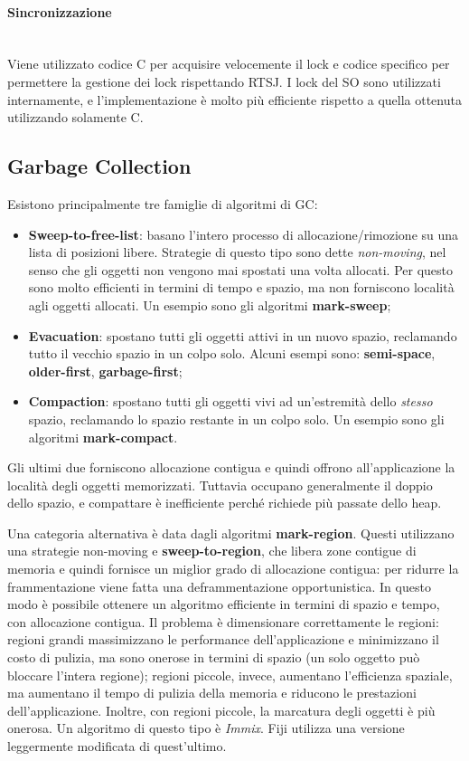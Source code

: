 \paragraph{Sincronizzazione} \mbox{} \\
Viene utilizzato codice C per acquisire velocemente il lock e codice specifico per permettere la gestione dei lock rispettando RTSJ. I lock del SO sono utilizzati internamente, e l'implementazione è molto più efficiente rispetto a quella ottenuta utilizzando solamente C.

\subsection{Garbage Collection} \label{sec:gc}
Esistono principalmente tre famiglie di algoritmi di GC:
\begin{itemize}
	\item \textbf{Sweep-to-free-list}: basano l'intero processo di allocazione/rimozione su una lista di posizioni libere. Strategie di questo tipo sono dette \textit{non-moving}, nel senso che gli oggetti non vengono mai spostati una volta allocati. Per questo sono molto efficienti in termini di tempo e spazio, ma non forniscono località agli oggetti allocati. Un esempio sono gli algoritmi \textbf{mark-sweep};
	\item \textbf{Evacuation}: spostano tutti gli oggetti attivi in un nuovo spazio, reclamando tutto il vecchio spazio in un colpo solo. Alcuni esempi sono: \textbf{semi-space}, \textbf{older-first}, \textbf{garbage-first};
	\item \textbf{Compaction}: spostano tutti gli oggetti vivi ad un'estremità dello \textit{stesso} spazio, reclamando lo spazio restante in un colpo solo. Un esempio sono gli algoritmi \textbf{mark-compact}.
\end{itemize}
Gli ultimi due forniscono allocazione contigua e quindi offrono all'applicazione la località degli oggetti memorizzati. Tuttavia occupano generalmente il doppio dello spazio, e compattare è inefficiente perché richiede più passate dello heap.

Una categoria alternativa è data dagli algoritmi \textbf{mark-region}. Questi utilizzano una strategie non-moving e \textbf{sweep-to-region}, che libera zone contigue di memoria e quindi fornisce un miglior grado di allocazione contigua: per ridurre la frammentazione viene fatta una deframmentazione opportunistica. In questo modo è possibile ottenere un algoritmo efficiente in termini di spazio e tempo, con allocazione contigua. Il problema è dimensionare correttamente le regioni: regioni grandi massimizzano le performance dell'applicazione e minimizzano il costo di pulizia, ma sono onerose in termini di spazio (un solo oggetto può bloccare l'intera regione); regioni piccole, invece, aumentano l'efficienza spaziale, ma aumentano il tempo di pulizia della memoria e riducono le prestazioni dell'applicazione. Inoltre, con regioni piccole, la marcatura degli oggetti è più onerosa. Un algoritmo di questo tipo è \textit{Immix}. Fiji utilizza una versione leggermente modificata di quest'ultimo.

